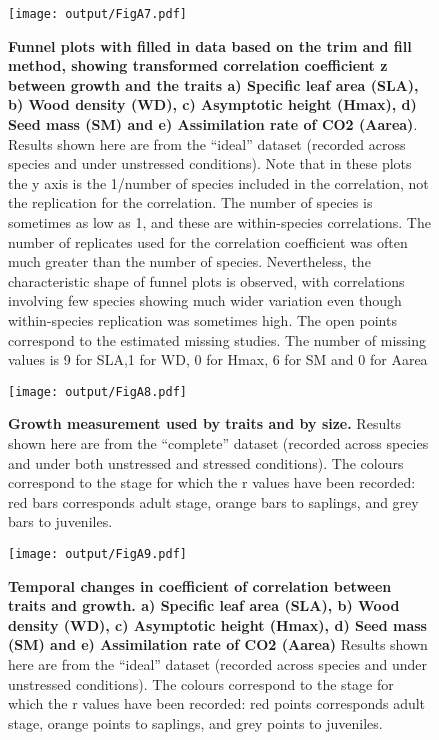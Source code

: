 \documentclass[a4paper]{article}\usepackage[]{graphicx}\usepackage[]{color}
\begin{document}
\begin{appendices}
\begin{figure}[h!]
\centering
\texttt{[image: output/FigA7.pdf]}
\caption{\textbf{Funnel plots with filled in data based on the trim and fill method, showing transformed correlation coefficient z between growth and the traits a) Specific leaf area (SLA), b) Wood density (WD), c) Asymptotic height (Hmax), d) Seed mass (SM) and e) Assimilation rate of CO2 (Aarea)}. Results shown here are from the ``ideal'' dataset (recorded across species and under unstressed conditions).  Note that in these plots the y axis is the 1/number of species included in the correlation, not the replication for the correlation. The number of species is sometimes as low as 1, and these are within-species correlations. The number of replicates used for the correlation coefficient was often much greater than the number of species. Nevertheless, the characteristic shape of funnel plots is observed, with correlations involving few species showing much wider variation even though within-species replication was sometimes high. The open points correspond to the estimated missing studies. The number of missing values is 9 for SLA,1 for WD, 0 for Hmax, 6 for SM and 0 for Aarea}
\label{fig:figA7}
\end{figure}

\begin{figure}[h!]
\centering
\texttt{[image: output/FigA8.pdf]}
\caption{\textbf{Growth measurement used by traits and by size.} Results shown here are from the ``complete'' dataset (recorded across species and under both unstressed and stressed conditions). The colours correspond to the stage for which the r values have been recorded: red bars corresponds adult stage, orange bars to saplings, and grey bars to juveniles.}
\label{fig:figA8}
\end{figure}

\begin{figure}[h!]
\centering
\texttt{[image: output/FigA9.pdf]}
\caption{\textbf{Temporal changes in coefficient of correlation between traits and growth. a) Specific leaf area (SLA), b) Wood density (WD), c) Asymptotic height (Hmax), d) Seed mass (SM) and e) Assimilation rate of CO2 (Aarea)} Results shown here are from the ``ideal'' dataset (recorded across species and under  unstressed conditions). The colours correspond to the stage for which the r values have been recorded: red points corresponds adult stage, orange points to saplings, and grey points to juveniles.}
\label{fig:figA9}
\end{figure}


\end{appendices}
\end{document}
